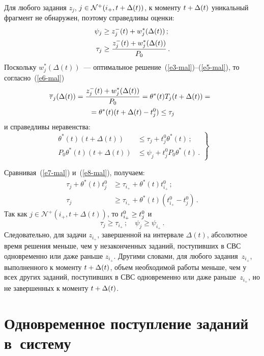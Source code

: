\begin{multicols}{2}
Для любого задания $z_{j}$,  $j \hm\in \mathcal{N}^+(i_+, t + \Delta(t))$, к
моменту $t \hm+ \Delta(t)$ уникальный фрагмент не обнаружен, поэтому
справедливы оценки:
\begin{align*}
\psi_{j} &\ge   z^-_{j}(t)+w^*_{j}(\Delta(t))\,;\\
\tau_{j} &\ge   \displaystyle\frac{\displaystyle z^-_{j}(t)+w^*_{j}(\Delta(t))\mathstrut}{\displaystyle P_0\mathstrut}\,.
\end{align*}
Поскольку $w_{j}^*(\Delta(t))$~--- оптимальное решение~(\ref{e3-mal})--(\ref{e5-mal}), то
согласно~(\ref{e6-mal})
\begin{multline*}
\hspace*{-3.31975pt}\overline{\tau}_{j}(\Delta(t)) =  
\displaystyle\frac{\displaystyle z^-_{j}(t)+w^*_{j}(\Delta(t))\mathstrut}{\displaystyle P_0\mathstrut} =  \theta^*(t)  T_{j}(t + \Delta(t))  ={}\\
{} = \theta^*(t)  (t + \Delta(t) - t^0_{j})\le \tau_{j}
\end{multline*}
и справедливы неравенства:
\begin{equation}
 \left.  \begin{array}{rl}
\theta^*(t) (t + \Delta(t)) &\le \tau_{j} +   t^0_{j} \theta^*(t)\,;\\[9pt]
P_0 \theta^*(t)(t + \Delta(t)) &\le \psi_{j} + t^0_{j} P_0 \theta^*(t) \,.
                    \end{array}
                    \right \} \label{e8-mal}
                    \end{equation}

Сравнивая~(\ref{e7-mal}) и~(\ref{e8-mal}), получаем:
\begin{align*}
\tau_{j} +  \theta^*(t)  t^0_{j}& \ge \tau_{i_+} +  \theta^*(t)   t^0_{i_+}   \,;
\\
\tau_{j} &\ge   \tau_{i_+} +  \theta^*(t) (t^0_{i_+} -  t^0_{j})\,. 
\end{align*}
Так как $j \in \mathcal{N}^+(i_+, t + \Delta(t))$, то $t^0_{i_+} \hm\ge t^0_{j}$ и
$$   \tau_{j}  \ge \tau_{i_+}\,;\quad
\psi_{j}  \ge \psi_{i_+}\,. 
$$
Следовательно, для задачи $z_{i_+}$, завершенной на интервале
$\Delta(t)$, абсолютное время решения меньше, чем у незаконченных
заданий, поступивших в СВС одновременно или даже раньше $z_{i_+}$.
Другими словами, для любого задания~$z_{i_+}$, выполненного к
моменту  $t \hm+ \Delta(t)$, объем необходимой работы меньше, чем у
всех других заданий, поступивших в СВС одновременно или даже раньше~$z_{i_+}$, 
но не завершенных к моменту $t \hm+ \Delta(t)$.

\section{Одновременное поступление заданий в~систему}


\end{multicols}
